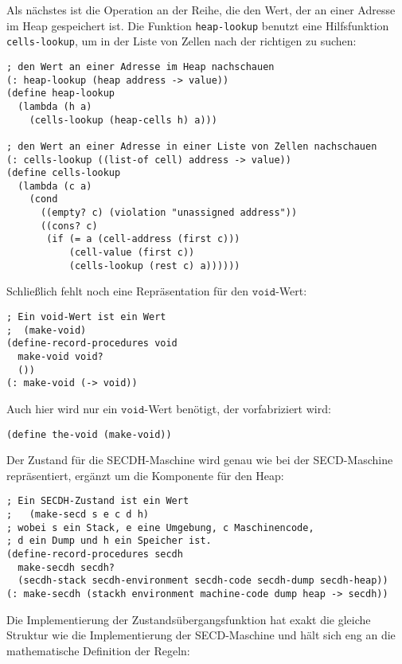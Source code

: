 %
Als nächstes ist die Operation an der Reihe, die den Wert, der an einer
Adresse im Heap gespeichert ist.  Die Funktion \texttt{heap-lookup} benutzt
eine Hilfsfunktion \texttt{cells-lookup}, um in der Liste von Zellen
nach der richtigen zu suchen:
%
\begin{verbatim}
; den Wert an einer Adresse im Heap nachschauen
(: heap-lookup (heap address -> value))
(define heap-lookup
  (lambda (h a)
    (cells-lookup (heap-cells h) a)))

; den Wert an einer Adresse in einer Liste von Zellen nachschauen
(: cells-lookup ((list-of cell) address -> value))
(define cells-lookup
  (lambda (c a)
    (cond
      ((empty? c) (violation "unassigned address"))
      ((cons? c)
       (if (= a (cell-address (first c)))
           (cell-value (first c))
           (cells-lookup (rest c) a))))))
\end{verbatim}
%
Schließlich fehlt noch eine Repräsentation für den $\mathtt{void}$-Wert:
%
\begin{verbatim}
; Ein void-Wert ist ein Wert
;  (make-void)
(define-record-procedures void
  make-void void?
  ())
(: make-void (-> void))
\end{verbatim}
%
Auch hier wird nur ein $\mathtt{void}$-Wert benötigt, der 
vorfabriziert wird:
%
\begin{verbatim}
(define the-void (make-void))
\end{verbatim}
%
Der Zustand für die SECDH-Maschine wird genau wie bei der
SECD-Maschine repräsentiert, ergänzt um die Komponente für den Heap:
%
\begin{verbatim}
; Ein SECDH-Zustand ist ein Wert
;   (make-secd s e c d h)
; wobei s ein Stack, e eine Umgebung, c Maschinencode,
; d ein Dump und h ein Speicher ist.
(define-record-procedures secdh
  make-secdh secdh?
  (secdh-stack secdh-environment secdh-code secdh-dump secdh-heap))
(: make-secdh (stackh environment machine-code dump heap -> secdh))
\end{verbatim}
%
Die Implementierung der Zustandsübergangsfunktion hat exakt die
gleiche Struktur wie die Implementierung der SECD-Maschine und hält
sich eng an die mathematische Definition der Regeln:
%
